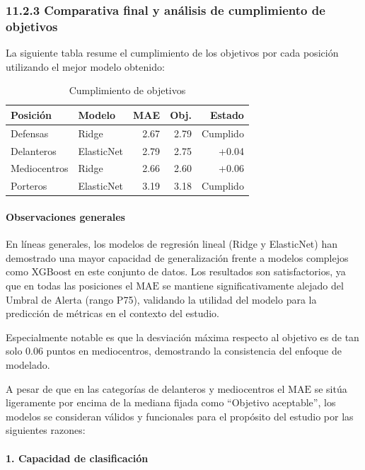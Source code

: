 \subsubsection{11.2.3 Comparativa final y análisis de cumplimiento de objetivos}

La siguiente tabla resume el cumplimiento de los objetivos por 
cada posición utilizando el mejor modelo obtenido:

\begin{table}[H]
\centering
\small
\begin{tabular}{|l|l|r|r|r|}
\hline
\textbf{Posición} & \textbf{Modelo} & \textbf{MAE} & 
\textbf{Obj.} & \textbf{Estado} \\
\hline
Defensas & Ridge & 2.67 & 2.79 & Cumplido \\
Delanteros & ElasticNet & 2.79 & 2.75 & +0.04 \\
Mediocentros & Ridge & 2.66 & 2.60 & +0.06 \\
Porteros & ElasticNet & 3.19 & 3.18 & Cumplido \\
\hline
\end{tabular}
\caption{Cumplimiento de objetivos}
\end{table}


\paragraph{Observaciones generales}

En líneas generales, los modelos de regresión lineal (Ridge y 
ElasticNet) han demostrado una mayor capacidad de generalización 
frente a modelos complejos como XGBoost en este conjunto de datos. 
Los resultados son satisfactorios, ya que en todas las posiciones 
el $\mathrm{MAE}$ se mantiene significativamente alejado 
del Umbral de Alerta (rango P75), validando la utilidad del 
modelo para la predicción de métricas en el contexto del estudio.

Especialmente notable es que la desviación máxima respecto al 
objetivo es de tan solo 0.06 puntos en mediocentros, demostrando 
la consistencia del enfoque de modelado.

A pesar de que en las categorías de delanteros y mediocentros el 
$\mathrm{MAE}$ se sitúa ligeramente por encima de la mediana fijada 
como ``Objetivo aceptable'', los modelos se consideran 
válidos y funcionales para el propósito del estudio por 
las siguientes razones:

\paragraph{1. Capacidad de clasificación}

